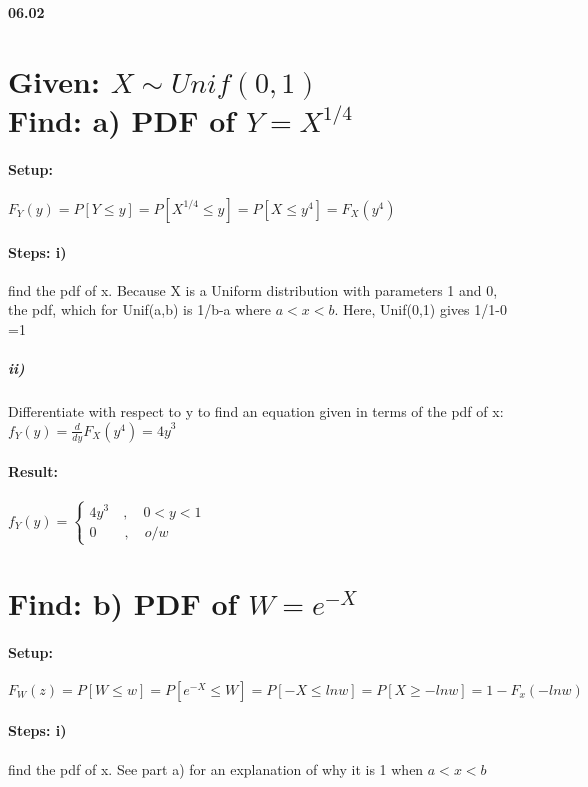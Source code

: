 
{\bf 06.02} 

\section*{Given: $X\sim Unif(0,1)$\\ Find: a) PDF of $Y={X}^{1/4}$ }

\paragraph{Setup:} ${ F }_{ Y }(y)=P[Y\le y]=P[{X}^{1/4}\le y]=P[X \le{y}^{4} ]={ F }_{ X }({y}^{4})$

\paragraph{Steps: i)} find the pdf of x. Because X is a Uniform distribution with parameters 1 and 0, the pdf, which for Unif(a,b) is 1/b-a where $a<x<b$. Here, Unif(0,1) gives 1/1-0 =1

\subparagraph{ii)}Differentiate with respect to y to find an equation given in terms of the pdf of x:\\ ${ f }_{ Y }(y)=\frac { d }{ dy } { F }_{ X }({y}^{4})={4y}^{3}$

\paragraph{Result:} ${ f }_{ Y }(y)=\begin{cases} { 4y }^{3} \quad ,\quad 0<{y}<1 \\ 0\quad  \quad ,\quad o/w \end{cases}$

\section*{Find: b) PDF of $W={e}^{-X}$ }

\paragraph{Setup:} ${ F }_{ W }(z)=P[W\le w]=P[{e}^{-X}\le W]=P[-X \le{lnw} ]=P[X \ge {-lnw}]= 1-{F}_{x}(-lnw)$

\paragraph{Steps: i)} find the pdf of x. See part a) for an explanation of why it is 1 when $a<x<b$


